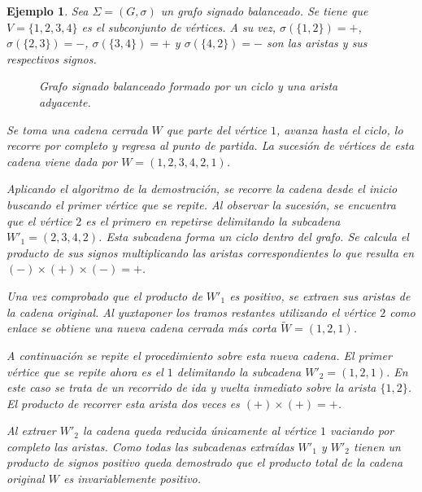 \documentclass[11pt,a4paper,spanish]{report}
\theoremstyle{plain}
\newtheorem{ejemplo}{Ejemplo}[chapter]
\begin{document}
\begin{ejemplo} \label{ejemplo_cadena_cerrada}
Sea $\Sigma=(G,\sigma)$ un grafo signado balanceado. Se tiene que $V=\{1, 2, 3, 4\}$ es el subconjunto de vértices. A su vez, $\sigma(\{1,2\})=+$, $\sigma(\{2,3\})=-$, $\sigma(\{3,4\})=+$ y $\sigma(\{4,2\})=-$ son las aristas y sus respectivos signos.

\begin{figure}[H]
\begin{center}
\end{center}
     \caption{{Grafo signado balanceado formado por un ciclo y una arista adyacente.}}
     \label{fig_ejemplo_cadena}
\end{figure}

Se toma una cadena cerrada $W$ que parte del vértice $1$, avanza hasta el ciclo, lo recorre por completo y regresa al punto de partida. La sucesión de vértices de esta cadena viene dada por $W = (1, 2, 3, 4, 2, 1)$.

Aplicando el algoritmo de la demostración, se recorre la cadena desde el inicio buscando el primer vértice que se repite. Al observar la sucesión, se encuentra que el vértice $2$ es el primero en repetirse delimitando la subcadena $W'_1 = (2, 3, 4, 2)$. Esta subcadena forma un ciclo dentro del grafo. Se calcula el producto de sus signos multiplicando las aristas correspondientes lo que resulta en $(-)\times(+)\times(-) = +$.

Una vez comprobado que el producto de $W'_1$ es positivo, se extraen sus aristas de la cadena original. Al yuxtaponer los tramos restantes utilizando el vértice $2$ como enlace se obtiene una nueva cadena cerrada más corta $\widetilde{W} = (1, 2, 1)$.

A continuación se repite el procedimiento sobre esta nueva cadena. El primer vértice que se repite ahora es el $1$ delimitando la subcadena $W'_2 = (1, 2, 1)$. En este caso se trata de un recorrido de ida y vuelta inmediato sobre la arista $\{1,2\}$. El producto de recorrer esta arista dos veces es $(+)\times(+) = +$.

Al extraer $W'_2$ la cadena queda reducida únicamente al vértice $1$ vaciando por completo las aristas. Como todas las subcadenas extraídas $W'_1$ y $W'_2$ tienen un producto de signos positivo queda demostrado  que el producto total de la cadena original $W$ es invariablemente positivo.
\end{ejemplo}
\end{document}
